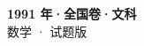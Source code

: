 \documentclass[zihao=-4, a4paper]{ctexart}
\begin{document}
\begin{center}
  {\Large\bfseries 1991 年·全国卷·文科}\\[4pt]
  {\large 数学 · 试题版}
\end{center}
\medskip
{}

\end{document}
